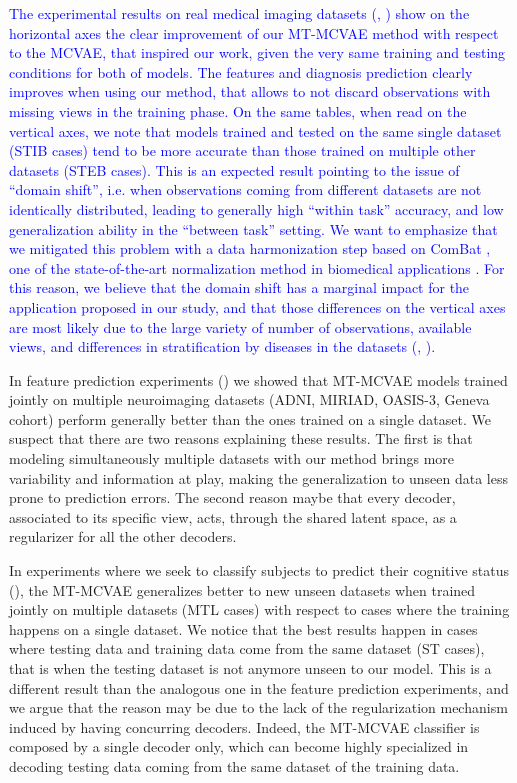 \textcolor{blue}{
	The experimental results on real medical imaging datasets (, ) show on the horizontal axes the clear improvement of our MT-MCVAE method with respect to the MCVAE, that inspired our work,
	given the very same training and testing conditions for both of models.
	The features and diagnosis prediction clearly improves when using our method, that allows to not discard observations with missing views in the training phase.
	On the same tables, when read on the vertical axes, we note that models trained and tested on the same single dataset (STIB cases) tend to be more accurate than those trained on multiple other datasets (STEB cases).
	This is an expected result pointing to the issue of ``domain shift'', i.e. when observations coming from different datasets are not identically distributed,
	leading to generally high ``within task'' accuracy, and low generalization ability in the ``between task'' setting.
	We want to emphasize that we mitigated this problem with a data harmonization step based on ComBat \citep{combat},
	one of the state-of-the-art normalization method in biomedical applications \citep{Fortin2017, Fortin2018, Orlhac2020}.
	For this reason, we believe that the domain shift has a marginal impact for the application proposed in our study,
	and that those differences on the vertical axes are most likely due to the large variety of number of observations, available views, and differences in stratification by diseases in the datasets (\cf {}, ).
}

In feature prediction experiments () we showed that MT-MCVAE models trained jointly on multiple neuroimaging datasets (ADNI, MIRIAD, OASIS-3, Geneva cohort)
perform generally better than the ones trained on a single dataset.
We suspect that there are two reasons explaining these results.
The first is that modeling simultaneously multiple datasets with our method brings more variability and information at play, making the generalization to unseen data less prone to prediction errors.
The second reason maybe that every decoder, associated to its specific view, acts, through the shared latent space, as a regularizer for all the other decoders.

In experiments where we seek to classify subjects to predict their cognitive status (),
the MT-MCVAE generalizes better to new unseen datasets when trained jointly on multiple datasets (MTL cases) with respect to cases where the training happens on a single dataset.
We notice that the best results happen in cases where testing data and training data come from the same dataset (ST cases), that is when the testing dataset is not anymore unseen to our model.
This is a different result than the analogous one in the feature prediction experiments, and we argue that the reason may be due to the lack of the regularization mechanism induced by having concurring decoders.
Indeed, the MT-MCVAE classifier is composed by a single decoder only, which can become highly specialized in decoding testing data coming from the same dataset of the training data.

